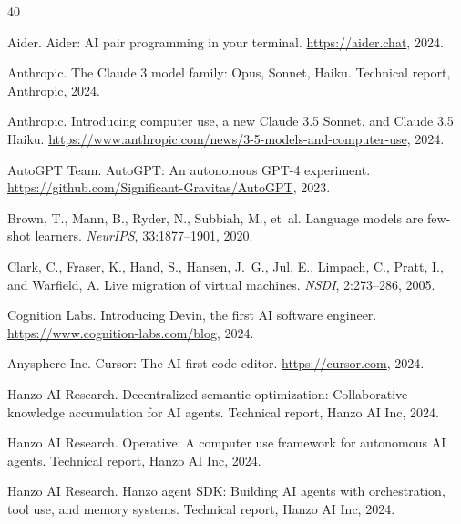 
\begin{thebibliography}{40}

Aider.
\newblock Aider: AI pair programming in your terminal.
\newblock \url{https://aider.chat}, 2024.

Anthropic.
\newblock The Claude 3 model family: Opus, Sonnet, Haiku.
\newblock Technical report, Anthropic, 2024.

Anthropic.
\newblock Introducing computer use, a new Claude 3.5 Sonnet, and Claude 3.5 Haiku.
\newblock \url{https://www.anthropic.com/news/3-5-models-and-computer-use}, 2024.

AutoGPT Team.
\newblock AutoGPT: An autonomous GPT-4 experiment.
\newblock \url{https://github.com/Significant-Gravitas/AutoGPT}, 2023.

Brown, T., Mann, B., Ryder, N., Subbiah, M., et~al.
\newblock Language models are few-shot learners.
\newblock \emph{NeurIPS}, 33:1877--1901, 2020.

Clark, C., Fraser, K., Hand, S., Hansen, J.~G., Jul, E., Limpach, C.,
  Pratt, I., and Warfield, A.
\newblock Live migration of virtual machines.
\newblock \emph{NSDI}, 2:273--286, 2005.

Cognition Labs.
\newblock Introducing Devin, the first AI software engineer.
\newblock \url{https://www.cognition-labs.com/blog}, 2024.

Anysphere Inc.
\newblock Cursor: The AI-first code editor.
\newblock \url{https://cursor.com}, 2024.

Hanzo AI Research.
\newblock Decentralized semantic optimization: Collaborative knowledge
  accumulation for AI agents.
\newblock Technical report, Hanzo AI Inc, 2024.

Hanzo AI Research.
\newblock Operative: A computer use framework for autonomous AI agents.
\newblock Technical report, Hanzo AI Inc, 2024.

Hanzo AI Research.
\newblock Hanzo agent SDK: Building AI agents with orchestration, tool use,
  and memory systems.
\newblock Technical report, Hanzo AI Inc, 2024.


\end{thebibliography}
